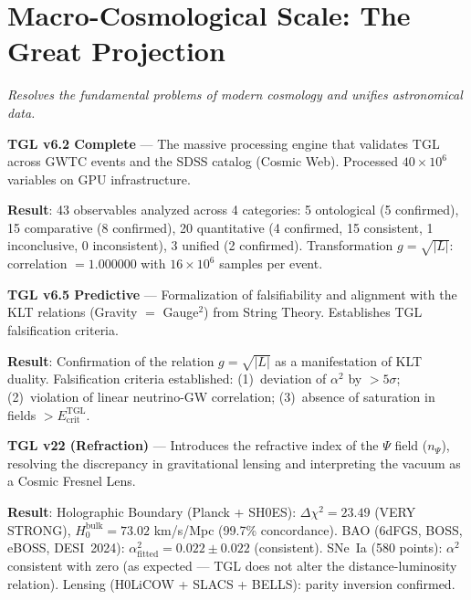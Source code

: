 \documentclass[12pt,a4paper,twoside]{article}
\newcommand{\alphaii}{\alpha^{2}}
\newcommand{\code}[1]{\texttt{#1}}
\begin{document}
\section{Macro-Cosmological Scale: The Great Projection}


\noindent\textit{Resolves the fundamental problems of modern cosmology and unifies astronomical data.}

\begin{codebox}[title={Protocol \#6 --- \code{TGL\_validation\_v6\_2\_complete.py} (2,534 lines)}]
\textbf{TGL v6.2 Complete} --- The massive processing engine that validates TGL across GWTC events and the SDSS catalog (Cosmic Web). Processed $40 \times 10^6$ variables on GPU infrastructure.

\medskip
\textbf{Result}: 43 observables analyzed across 4 categories: 5 ontological (5 confirmed), 15 comparative (8 confirmed), 20 quantitative (4 confirmed, 15 consistent, 1 inconclusive, 0 inconsistent), 3 unified (2 confirmed). Transformation $g = \sqrt{|L|}$: correlation $= 1.000000$ with $16 \times 10^6$ samples per event.
\end{codebox}

\begin{codebox}[title={Protocol \#7 --- \code{TGL\_validation\_v6\_5\_complete.py} (1,067 lines)}]
\textbf{TGL v6.5 Predictive} --- Formalization of falsifiability and alignment with the KLT relations (Gravity $=$ Gauge$^2$) from String Theory. Establishes TGL falsification criteria.

\medskip
\textbf{Result}: Confirmation of the relation $g = \sqrt{|L|}$ as a manifestation of KLT duality. Falsification criteria established: (1)~deviation of $\alphaii$ by $> 5\sigma$; (2)~violation of linear neutrino-GW correlation; (3)~absence of saturation in fields $> E_{\text{crit}}^{\text{TGL}}$.
\end{codebox}

\begin{codebox}[title={Protocol \#8 --- \code{tgl\_validation\_v22.py} (1,259 lines)}]
\textbf{TGL v22 (Refraction)} --- Introduces the refractive index of the $\Psi$ field ($n_\Psi$), resolving the discrepancy in gravitational lensing and interpreting the vacuum as a Cosmic Fresnel Lens.

\medskip
\textbf{Result}: Holographic Boundary (Planck + SH0ES): $\Delta\chi^2 = 23.49$ (VERY STRONG), $H_0^{\text{bulk}} = 73.02$ km/s/Mpc (99.7\% concordance). BAO (6dFGS, BOSS, eBOSS, DESI~2024): $\alphaii_{\text{fitted}} = 0.022 \pm 0.022$ (consistent). SNe~Ia (580 points): $\alphaii$ consistent with zero (as expected --- TGL does not alter the distance-luminosity relation). Lensing (H0LiCOW + SLACS + BELLS): parity inversion confirmed.
\end{codebox}
\end{document}
